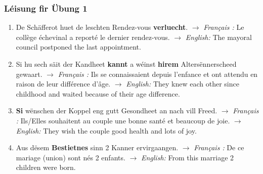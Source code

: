 \subsubsection*{Léisung fir Übung 1}
\begin{enumerate}
    \item De Schäfferot huet de leschten Rendez-vous \textbf{verluecht}.
    $\rightarrow$ \textit{Français :} Le collège échevinal a reporté le dernier rendez-vous.
    $\rightarrow$ \textit{English:} The mayoral council postponed the last appointment.

    \item Si hu sech säit der Kandheet \textbf{kannt} a wéinst \textbf{hirem} Altersënnerscheed gewaart.
    $\rightarrow$ \textit{Français :} Ils se connaissaient depuis l'enfance et ont attendu en raison de leur différence d'âge.
    $\rightarrow$ \textit{English:} They knew each other since childhood and waited because of their age difference.

    \item \textbf{Si} wënschen der Koppel eng gutt Gesondheet an nach vill Freed.
    $\rightarrow$ \textit{Français :} Ils/Elles souhaitent au couple une bonne santé et beaucoup de joie.
    $\rightarrow$ \textit{English:} They wish the couple good health and lots of joy.

    \item Aus dësem \textbf{Bestietnes} sinn 2 Kanner ervirgaangen.
    $\rightarrow$ \textit{Français :} De ce mariage (union) sont nés 2 enfants.
    $\rightarrow$ \textit{English:} From this marriage 2 children were born.
\end{enumerate}

